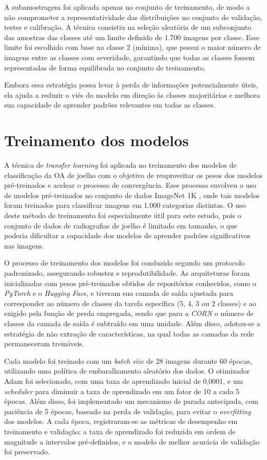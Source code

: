 A subamostragem foi aplicada apenas no conjunto de treinamento, de modo a não comprometer a representatividade das distribuições no conjunto de validação, testes e calibração. A técnica consistiu na seleção aleatória de um subconjunto das amostras das classes até um limite definido de 1.700 imagens por classe. Esse limite foi escolhido com base na classe 2 (mínima), que possui o maior número de imagens entre as classes com severidade, garantindo que todas as classes fossem representadas de forma equilibrada no conjunto de treinamento.

Embora essa estratégia possa levar à perda de informações potencialmente úteis, ela ajuda a reduzir o viés do modelo em direção às classes majoritárias e melhora sua capacidade de aprender padrões relevantes em todas as classes.

\section{Treinamento dos modelos}

A técnica de \textit{transfer learning} foi aplicada no treinamento dos modelos de classificação da OA de joelho com o objetivo de reaproveitar os pesos dos modelos pré-treinados e acelear o processo de convergência. Esse processo envolveu o uso de modelos pré-treinados no conjunto de dados ImageNet 1K \citep{Russakovsky2015}, onde tais modelos foram treinados para classificar imagens em 1.000 categorias distintas. O uso deste método de treinamento foi especialmente útil para este estudo, pois o conjunto de dados de radiografias de joelho é limitado em tamanho, o que poderia dificultar a capacidade dos modelos de aprender padrões significativos nas imagens.

O processo de treinamento dos modelos foi conduzido segundo um protocolo padronizado, assegurando robustez e reprodutibilidade. As arquiteturas foram inicializadas com pesos pré‑treinados obtidos de repositórios conhecidos, como o \textit{PyTorch} e o \textit{Hugging Face}, e tiveram sua camada de saída ajustada para corresponder ao número de classes da tarefa específica (5, 4, 3 ou 2 classes) e ao exigido pela função de perda empregada, sendo que para a \textit{CORN} o número de classes da camada de saída é subtraído em uma unidade. Além disso, adotou‑se a estratégia de não extração de características, na qual todas as camadas da rede permaneceram treináveis.

Cada modelo foi treinado com um \textit{batch size} de 28 imagens durante 60 épocas, utilizando uma política de embaralhamento aleatório dos dados. O otimizador Adam foi selecionado, com uma taxa de aprendizado inicial de 0,0001, e um \textit{scheduler} para diminuir a taxa de aprendizado em um fator de 10 a cada 5 épocas. Além disso, foi implementado um mecanismo de parada antecipada, com paciência de 5 épocas, baseado na perda de validação, para evitar o \textit{overfitting} dos modelos. A cada época, registraram‑se as métricas de desempenho em treinamento e validação; a taxa de aprendizado foi reduzida em ordem de magnitude a intervalos pré‑definidos, e o modelo de melhor acurácia de validação foi preservado.

